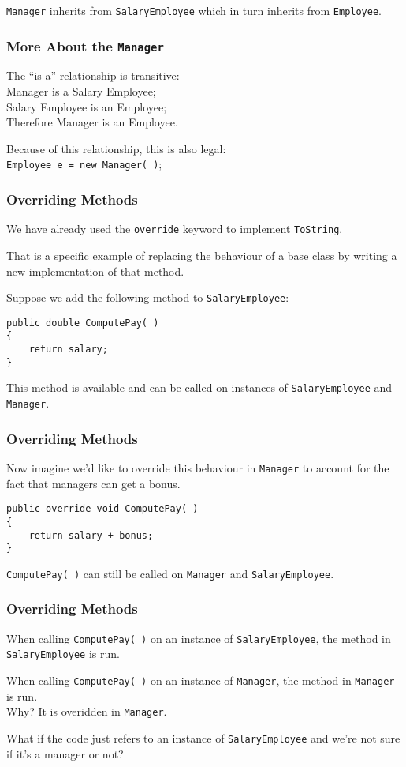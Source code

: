 \begin{frame}

\texttt{Manager} inherits from \texttt{SalaryEmployee} which in turn inherits from \texttt{Employee}.

\frametitle{More About the \texttt{Manager}}
The ``is-a'' relationship is transitive:\\
\quad Manager is a Salary Employee;\\
\quad Salary Employee is an Employee;\\
\quad Therefore Manager is an Employee.

Because of this relationship, this is also legal:\\
\quad \texttt{Employee e = new Manager( )};

\end{frame}


\begin{frame}[fragile]
\frametitle{Overriding Methods}
We have already used the \texttt{override} keyword to implement \texttt{ToString}.

That is a specific example of replacing the behaviour of a base class by writing a new implementation of that method.

Suppose we add the following method to \texttt{SalaryEmployee}:
\begin{verbatim}
public double ComputePay( )
{
    return salary;
}
\end{verbatim}

This method is available and can be called on instances of \texttt{SalaryEmployee} and \texttt{Manager}.

\end{frame}


\begin{frame}[fragile]
\frametitle{Overriding Methods}
Now imagine we'd like to override this behaviour in \texttt{Manager} to account for the fact that managers can get a bonus.

\begin{verbatim}
public override void ComputePay( )
{
    return salary + bonus;
}
\end{verbatim}

\texttt{ComputePay( )} can still be called on \texttt{Manager} and \texttt{SalaryEmployee}.

\end{frame}

\begin{frame}
\frametitle{Overriding Methods}

When calling \texttt{ComputePay( )} on an instance of \texttt{SalaryEmployee}, the method in \texttt{SalaryEmployee} is run.

When calling \texttt{ComputePay( )} on an instance of \texttt{Manager}, the method in \texttt{Manager} is run.\\
\quad Why? It is overidden in \texttt{Manager}.

What if the code just refers to an instance of \texttt{SalaryEmployee} and we're not sure if it's a manager or not?

\end{frame}

